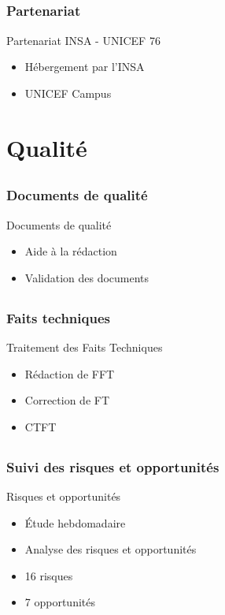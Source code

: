 \documentclass[compress,xcolor=dvipsnames]{beamer}
\begin{document}
\subsection{}
\begin{frame}
\frametitle{Partenariat}
\begin{block}{Partenariat INSA - UNICEF 76}
\begin{itemize}
	\item Hébergement par l'INSA
	\item UNICEF Campus
\end{itemize}
\end{block}
\end{frame}



\section{Qualité}
\subsection{}
\begin{frame}
\frametitle{Documents de qualité}
\begin{block}{Documents de qualité}
\begin{itemize}
	\item Aide à la rédaction
	\item Validation des documents
\end{itemize}
\end{block}
\end{frame}


\subsection{}
\begin{frame}
\frametitle{Faits techniques}
\begin{block}{Traitement des Faits Techniques}
\begin{itemize}
	\item Rédaction de FFT
	\item Correction de FT
	\item CTFT
\end{itemize}
\end{block}
\end{frame}


\subsection{}
\begin{frame}
\frametitle{Suivi des risques et opportunités}
\begin{block}{Risques et opportunités}
\begin{itemize}
	\item Étude hebdomadaire
	\item Analyse des risques et opportunités
	\item 16 risques
	\item 7 opportunités
\end{itemize}
\end{block}
\end{frame}
\end{document}
